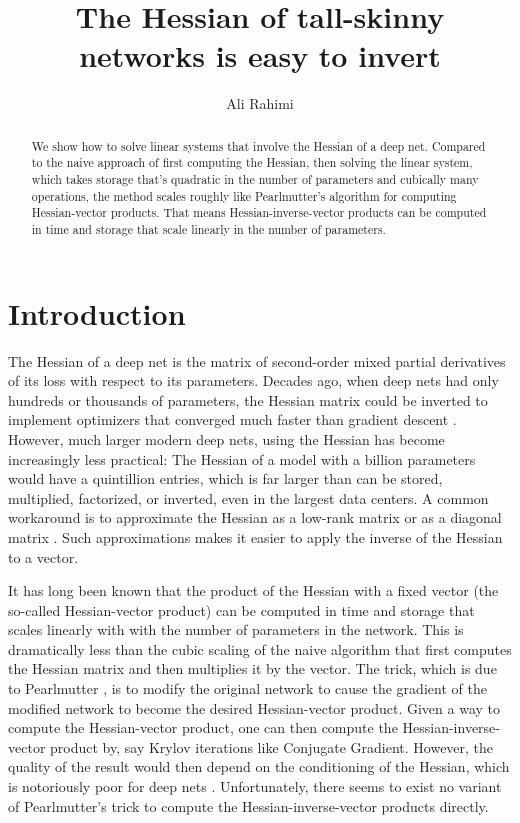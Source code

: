 \documentclass{article}
\title{The Hessian of tall-skinny networks is easy to invert}
\author{Ali Rahimi}
\begin{document}
\maketitle
\begin{abstract}
  We show how to solve linear systems that involve the Hessian of a deep net.
  Compared to the naive approach of first computing the Hessian, then solving
  the linear system, which takes storage that's quadratic in the number of
  parameters and cubically many operations, the method scales roughly like
  Pearlmutter's algorithm for computing Hessian-vector products. That means
  Hessian-inverse-vector products can be computed in time and storage that
  scale linearly in the number of parameters.
\end{abstract}

\section{Introduction}

The Hessian of a deep net is the matrix of second-order mixed partial derivatives of its loss with respect to its
parameters. Decades ago, when deep nets had only hundreds or thousands of parameters, the Hessian matrix could be
inverted to implement optimizers that converged much faster than gradient descent \cite{Watrous1987, Barnard1992}.
However, much larger modern deep nets, using the Hessian has become increasingly less practical: The Hessian of a model
with a billion parameters would have a quintillion entries, which is far larger than can be stored, multiplied,
factorized, or inverted, even in the largest data centers. A common workaround is to approximate the Hessian as a
low-rank matrix \cite{Webb1988, lbfgs-deep-net} or as a diagonal matrix \cite{becker-lecun-89, adagrad, adam}. Such
approximations makes it easier to apply the inverse of the Hessian to a vector.

It has long been known that the product of the Hessian with a fixed vector (the so-called Hessian-vector product) can
be computed in time and storage that scales linearly with with the number of parameters in the network. This is
dramatically less than the cubic scaling of the naive algorithm that first computes the Hessian matrix and then
multiplies it by the vector. The trick, which is due to Pearlmutter \cite{pearlmutter94}, is to modify the original
network to cause the gradient of the modified network to become the desired Hessian-vector product. Given a way to
compute the Hessian-vector product, one can then compute the Hessian-inverse-vector product by, say Krylov iterations
like Conjugate Gradient. However, the quality of the result would then depend on the conditioning of the Hessian, which
is notoriously poor for deep nets \cite{ying-behrooz-hessian-spectrum}. Unfortunately, there seems to exist no variant
of Pearlmutter's trick to compute the Hessian-inverse-vector products directly.
\end{document}
